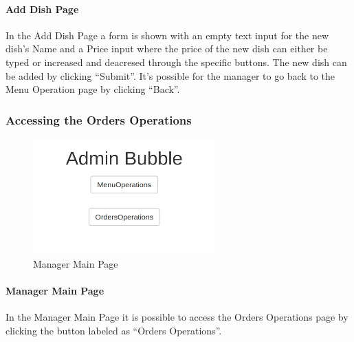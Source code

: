 \paragraph{Add Dish Page}
In the Add Dish Page a form is shown with an empty text input for the new dish's Name and a Price input where the price of the new dish can either be typed or increased and deacresed through the specific buttons. The new dish can be added by clicking ``Submit''.
It's possible for the manager to go back to the Menu Operation page by clicking ``Back''.

\subsubsection{Accessing the Orders Operations}
\begin{figure}[H]
	\centering
	\includegraphics[width=7cm]{../../documenti/UserManualDemo/demo_screens/admin_main.png}
	\caption{Manager Main Page}
\end{figure}
\paragraph{Manager Main Page}
In the Manager Main Page it is possible to access the Orders Operations page by clicking the button labeled as ``Orders Operations''.